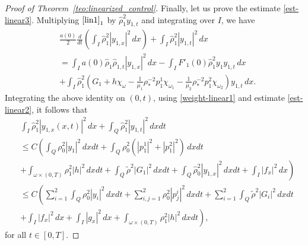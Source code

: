 \documentclass[11pt,a4paper]{amsart}
\numberwithin{equation}{section}
\begin{document}
\begin{proof}[Proof of Theorem~\ref{teo:linearized_control}]
Finally, let us prove  the  estimate \eqref{est-linear3}.  Multiplying    $\eqref{lin1}_{1}$  by  $\hat{\rho}^{2}_{1}y_{1,t}$ and  integrating over  $I$, we  have 
\begin{align*}
&\frac{a(0)}{2}\frac{d}{dt}\left( \int_{I}\hat{\rho}^{2}_{1}|y_{1,x}|^{2}\,dx	\right)+\int_{I}\hat{\rho}^{2}_{1}|y_{1,t}|^{2}\,dx\\
&=\int_{I}a(0)\hat{\rho}_{1}\hat{\rho}_{1,t}|y_{1,x}|^{2}\,dx-\int_{I}F'_{1}(0)\hat{\rho}^{2}_{1}y_{1}y_{1,t}\,dx  \\
&+\int_{I}\hat{\rho}^{2}_{1}(G_{1}+h\chi_{\omega}-\frac{1}{\mu_{1}}\rho^{-2}_{\ast}p^{1}_{1}\chi_{\omega_{1}}-\frac{1}{\mu_{2}}\rho^{-2}_{\ast}p^{2}_{1}\chi_{\omega_{2}})y_{1,t}\,dx.
\end{align*}Integrating the above  identity on $(0,t)$, using \eqref{weight-linear1} and estimate \eqref{est-linear2}, it follows that
\begin{equation}\label{linear-eq8}
\begin{split}
&\int_{I}\hat{\rho}^{2}_{1}|y_{1,x}(x, t)|^{2}\,dx+\int_{Q}\hat{\rho}^{2}_{1}|y_{1,t}|^{2}\,dxdt \\
& \leq C \left( \int_{Q}\rho^{2}_{0}|y_{1}|^{2}\,dxdt + \int_{Q}\rho^{2}_{0}(|p^{1}_{1}|^{2}+|p^{2}_{1}|^{2})\,dxdt \right.\\
&\left.	  +\int_{\omega\times(0,T)}\rho^{2}_{1}|h|^{2}\,dxdt+\int_{Q}\tilde{\rho}^{2}|G_{1}|^{2}\,dxdt +\int_{Q}\hat{\rho}^{2}_{0}|y_{1,x}|^{2}\,dxdt+\int_{I}|f_{x}|^{2}\,dx\right) \\
&\leq C\left( \sum_{i=1}^{2}\int_{Q}\rho^{2}_{0}|y_{i}|^{2}\,dxdt+\sum_{i,j=1}^{2}\rho^{2}_{0}|p^{i}_{j}|^{2}\,dxdt +\sum_{i=1}^{2}\int_{Q}\tilde{\rho}^{2}|G_{i}|^{2}\,dxdt \right.\\
&\left.+\int_{I}|f_{x}|^{2}\,dx+\int_{I}|g_{x}|^{2}\,dx+\int_{\omega\times(0,T)}\rho^{2}_{1}|h|^{2}\,dxdt\right),
\end{split}
\end{equation}for all $t \in [0, T]$.


\end{proof}
\end{document}
